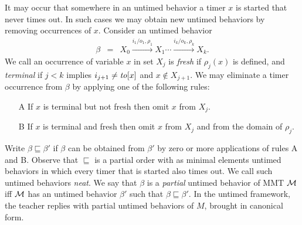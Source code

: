 It may occur that somewhere in an untimed behavior a timer $x$ is started that never times out.
In such cases we may obtain new untimed behaviors by removing occurrences of $x$.
Consider an untimed behavior
\begin{eqnarray*}
\beta & = & X_0 \xrightarrow{i_1/o_1, \rho_1} X_1  \cdots \xrightarrow{i_k/o_k, \rho_k} X_{k}.
\end{eqnarray*}
We call an occurrence of variable $x$ in set $X_j$ is \emph{fresh} if $\rho_j(x)$ is defined,
and \emph{terminal} if $j<k$ implies $i_{j+1} \neq \mathit{to}[x]$ and $x \not\in X_{j+1}$.
We may eliminate a timer occurrence from $\beta$ by applying one of the following rules:
\begin{itemize}
\item[A]
If $x$ is terminal but not fresh then omit $x$ from $X_j$.
\item[B]
If $x$ is terminal and fresh then omit $x$ from $X_j$ and from the domain of $\rho_j$.
\end{itemize}
Write $\beta \sqsubseteq \beta'$ if $\beta$ can be obtained from $\beta'$ by zero or more applications of rules A and B.
Observe that $\sqsubseteq$ is a partial order with as minimal elements untimed behaviors in which every timer that is started also times out.
We call such untimed behaviors \emph{neat}.
We say that $\beta$ is a \emph{partial} untimed behavior of MMT ${\mathcal M}$ iff ${\mathcal M}$ has an untimed behavior $\beta'$ such that $\beta \sqsubseteq \beta'$.
In the untimed framework, the teacher replies with partial untimed behaviors of $M$, brought in canonical form.

